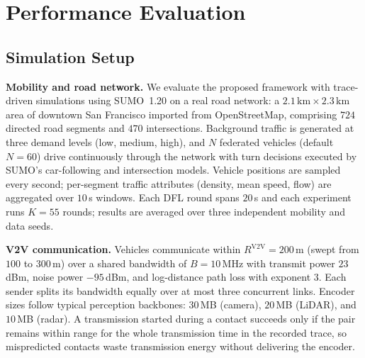 \section{Performance Evaluation}
\label{sec:evaluation}

\subsection{Simulation Setup}
\label{subsec:setup}

\textbf{Mobility and road network.}
We evaluate the proposed framework with trace-driven simulations using
SUMO~1.20 on a real road network: a $2.1\,\mathrm{km}\times2.3\,\mathrm{km}$
area of downtown San Francisco imported from OpenStreetMap, comprising
$724$ directed road segments and $470$ intersections. Background traffic is
generated at three demand levels (low, medium, high), and $N$ federated
vehicles (default $N{=}60$) drive continuously through the network with
turn decisions executed by SUMO's car-following and intersection models.
Vehicle positions are sampled every second; per-segment traffic attributes
(density, mean speed, flow) are aggregated over $10$\,s windows. Each DFL
round spans $20$\,s and each experiment runs $K{=}55$ rounds; results are
averaged over three independent mobility and data seeds.

\textbf{V2V communication.}
Vehicles communicate within $R^{\mathrm{V2V}}{=}200$\,m (swept from
$100$ to $300$\,m) over a shared bandwidth of $B{=}10$\,MHz with transmit
power $23$\,dBm, noise power $-95$\,dBm, and log-distance path loss with
exponent $3$. Each sender splits its bandwidth equally over at most three
concurrent links. Encoder sizes follow typical perception backbones:
$30$\,MB (camera), $20$\,MB (LiDAR), and $10$\,MB (radar). A transmission
started during a contact succeeds only if the pair remains within range for
the whole transmission time in the recorded trace, so mispredicted contacts
waste transmission energy without delivering the encoder.

